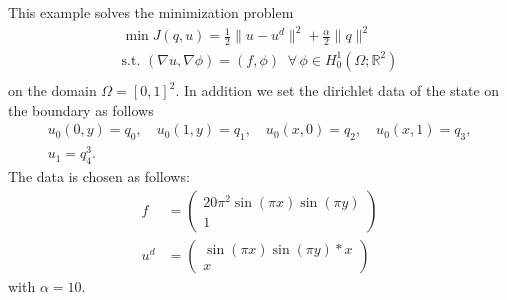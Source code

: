 This example solves the minimization problem
\begin{gather*}
\min J(q,u) = \frac{1}{2} \|u-u^d\|^2 + \frac{\alpha}{2}\|q\|^2\\
\text{s.t. } (\nabla u,\nabla \phi) = (f,\phi)\;\;\forall\,\phi \in H^1_0(\Omega; \mathbb R^2)\\
\end{gather*}
on the domain $\Omega = [0,1]^2$. In addition we set the dirichlet data of the state on the boundary as follows
\begin{gather*}
 u_0(0,y) = q_0,\quad u_0(1,y) = q_1,\quad u_0(x,0) = q_2,\quad u_0(x,1) = q_3,\\
 u_1 = q_4^3.
\end{gather*}
The data is chosen as follows:
\begin{align*}
 f &= \left(\begin{matrix}20\pi^2  \sin( \pi x) \sin(\pi y)\\1 \end{matrix}\right)\\
 u^d&= \left(\begin{matrix}\sin( \pi x) \sin(\pi y)*x\\x \end{matrix}\right)
\end{align*}
with $\alpha = 10$.

